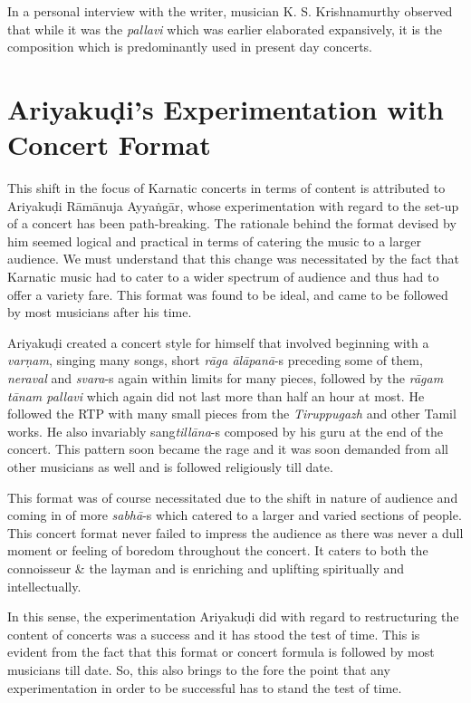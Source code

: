 In a personal interview with the writer, musician K. S. Krishnamurthy observed that while it was the \textit{pallavi} which was earlier elaborated expansively, it is the composition which is predominantly used in present day concerts.


\section*{Ariyakuḍi’s Experimentation with Concert Format}

This shift in the focus of Karnatic concerts in terms of content is attributed to Ariyakuḍi Rāmānuja Ayyaṅgār, whose experimentation with regard to the set-up of a concert has been path-breaking. The rationale behind the format devised by him seemed logical and practical in terms of catering the music to a larger audience. We must understand that this change was necessitated by the fact that Karnatic music had to cater to a wider spectrum of audience and thus had to offer a variety fare. This format was found to be ideal, and came to be followed by most musicians after his time.

Ariyakuḍi created a concert style for himself that involved beginning with a \textit{varṇam}, singing many songs, short \textit{rāga ālāpanā}-s preceding some of them, \textit{neraval} and \textit{svara}-s again within limits for many pieces, followed by the \textit{rāgam tānam pallavi} which again did not last more than half an hour at most. He followed the RTP with many small pieces from the \textit{Tiruppugazh} and other Tamil works. He also invariably sang\break \textit{tillāna}-s composed by his guru at the end of the concert. This pattern soon became the rage and it was soon demanded from all other musicians as well and is followed religiously till date.

This format was of course necessitated due to the shift in nature of audience and coming in of more \textit{sabhā}-s which catered to a larger and varied sections of people. This concert format never failed to impress the audience as there was never a dull moment or feeling of boredom throughout the concert. It caters to both the connoisseur \& the layman and is enriching and uplifting spiritually and intellectually. 

In this sense, the experimentation Ariyakuḍi did with regard to restructuring the content of concerts was a success and it has stood the test of time. This is evident from the fact that this format or concert formula is followed by most musicians till date. So, this also brings to the fore the point that any experimentation in order to be successful has to stand the test of time.

